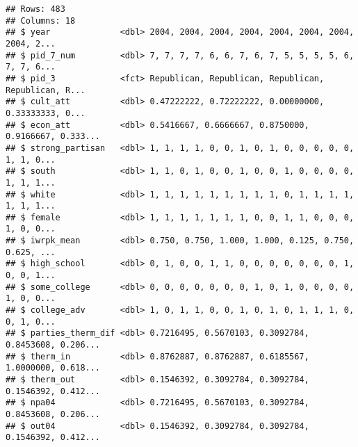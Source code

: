 \documentclass[
]{article}
\newenvironment{Shaded}{\begin{snugshade}}{\end{snugshade}}
\newcommand{\DecValTok}[1]{\textcolor[rgb]{0.00,0.00,0.81}{#1}}
\newcommand{\KeywordTok}[1]{\textcolor[rgb]{0.13,0.29,0.53}{\textbf{#1}}}
\newcommand{\NormalTok}[1]{#1}
\newcommand{\OperatorTok}[1]{\textcolor[rgb]{0.81,0.36,0.00}{\textbf{#1}}}
\newcommand{\StringTok}[1]{\textcolor[rgb]{0.31,0.60,0.02}{#1}}
\begin{document}
\begin{verbatim}
## Rows: 483
## Columns: 18
## $ year              <dbl> 2004, 2004, 2004, 2004, 2004, 2004, 2004, 2004, 2...
## $ pid_7_num         <dbl> 7, 7, 7, 7, 6, 6, 7, 6, 7, 5, 5, 5, 5, 6, 7, 7, 6...
## $ pid_3             <fct> Republican, Republican, Republican, Republican, R...
## $ cult_att          <dbl> 0.47222222, 0.72222222, 0.00000000, 0.33333333, 0...
## $ econ_att          <dbl> 0.5416667, 0.6666667, 0.8750000, 0.9166667, 0.333...
## $ strong_partisan   <dbl> 1, 1, 1, 1, 0, 0, 1, 0, 1, 0, 0, 0, 0, 0, 1, 1, 0...
## $ south             <dbl> 1, 1, 0, 1, 0, 0, 1, 0, 0, 1, 0, 0, 0, 0, 1, 1, 1...
## $ white             <dbl> 1, 1, 1, 1, 1, 1, 1, 1, 1, 0, 1, 1, 1, 1, 1, 1, 1...
## $ female            <dbl> 1, 1, 1, 1, 1, 1, 1, 0, 0, 1, 1, 0, 0, 0, 1, 0, 0...
## $ iwrpk_mean        <dbl> 0.750, 0.750, 1.000, 1.000, 0.125, 0.750, 0.625, ...
## $ high_school       <dbl> 0, 1, 0, 0, 1, 1, 0, 0, 0, 0, 0, 0, 0, 1, 0, 0, 1...
## $ some_college      <dbl> 0, 0, 0, 0, 0, 0, 0, 1, 0, 1, 0, 0, 0, 0, 1, 0, 0...
## $ college_adv       <dbl> 1, 0, 1, 1, 0, 0, 1, 0, 1, 0, 1, 1, 1, 0, 0, 1, 0...
## $ parties_therm_dif <dbl> 0.7216495, 0.5670103, 0.3092784, 0.8453608, 0.206...
## $ therm_in          <dbl> 0.8762887, 0.8762887, 0.6185567, 1.0000000, 0.618...
## $ therm_out         <dbl> 0.1546392, 0.3092784, 0.3092784, 0.1546392, 0.412...
## $ npa04             <dbl> 0.7216495, 0.5670103, 0.3092784, 0.8453608, 0.206...
## $ out04             <dbl> 0.1546392, 0.3092784, 0.3092784, 0.1546392, 0.412...
\end{verbatim}

\begin{Shaded}
\end{Shaded}
\end{document}
